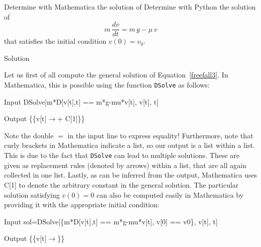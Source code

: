 \begin{example}\label{exFreefall} 
\ifmathematica
Determine with Mathematica the solution of\fi
\ifpython
Determine with Python the solution of\fi
$$
m\,\dfrac{d v}{d t}=m\,g-\mu\,v
$$
that satisfies the initial condition $v(0)=v_0$.

Solution 

\ifmathematica
Let us first of all compute the general solution  of Equation~\eqref{freefall3}. In Mathematica, this is possible using the function \lstinline{DSolve} as follows: 
\begin{mdframed}[default,backgroundcolor=gray!40,roundcorner=8pt]
\begin{mmaCell}{Input}
  DSolve[m*D[v[t],t] == m*g-mu*v[t], v[t], t]
\end{mmaCell}

\begin{mmaCell}{Output}
	 \{\{v[t]\(\to\)+ C[1]\}\}
\end{mmaCell}
\end{mdframed}
Note the double $=$ in the input line to express equality! Furthermore, note that curly brackets in Mathematica indicate a list, so our output is a list within a list. This is due to the fact that \lstinline{DSolve} can lead to multiple solutions. These are given as replacement rules (denoted by arrows) within a list, that are all again collected in one list.
Lastly, as can be inferred from the output, Mathematica uses C[1] to denote the arbitrary constant in the general solution. The particular solution satisfying $v(0)=0$ can also be computed easily in Mathematica by providing it with the appropriate initial condition:
\begin{mdframed}[default,backgroundcolor=gray!40,roundcorner=8pt]
\begin{mmaCell}{Input}
  sol=DSolve[\{m*D[v[t],t] == m*g-mu*v[t], v[0] == v0\}, v[t], t]
\end{mmaCell}

\begin{mmaCell}{Output}
  \{\{v[t]\(\to\)\}\}
\end{mmaCell}
\end{mdframed}


\end{example}
